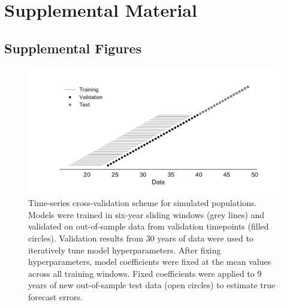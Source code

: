 \setcounter{figure}{0}
\setcounter{table}{0}
\renewcommand{\thefigure}{S\arabic{figure}}
\renewcommand{\thetable}{S\arabic{table}}

\section*{Supplemental Material}

\subsection*{Supplemental Figures}

\begin{figure}[H]
  \begin{center}
  \includegraphics[width=\textwidth]{figures/cross-validation-for-simulated-populations.pdf}
  \caption{
  Time-series cross-validation scheme for simulated populations.
  Models were trained in six-year sliding windows (grey lines) and validated on out-of-sample data from validation timepoints (filled circles).
  Validation results from 30 years of data were used to iteratively tune model hyperparameters.
  After fixing hyperparameters, model coefficients were fixed at the mean values across all training windows.
  Fixed coefficients were applied to 9 years of new out-of-sample test data (open circles) to estimate true forecast errors.
  }
  \label{sup_fig:cross_validation_for_simulated_populations}
  \end{center}
\end{figure}

